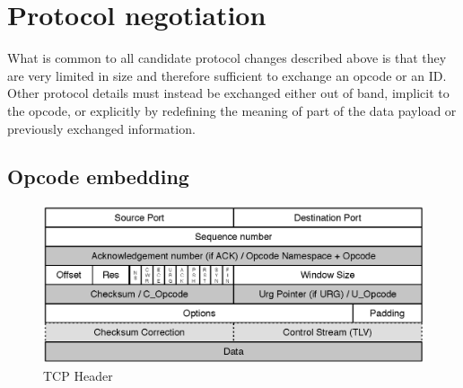 \documentclass{sig-alternate-10pt}
\begin{document}


\section{Protocol negotiation}
\label{sec:protocol}

What is common to all candidate protocol changes described above is that they are very limited in size and therefore sufficient to exchange an opcode or an ID. Other protocol details must instead be exchanged either out of band, implicit to the opcode, or explicitly by redefining the meaning of part of the data payload or previously exchanged information.

\subsection{Opcode embedding}

\begin{figure}[t!]
\centering
\includegraphics[width=\columnwidth]{figs/tcp-header}
\caption{TCP Header}
\label{fig:header}
\end{figure}
\end{document}
